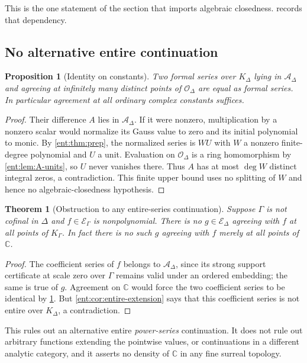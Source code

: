 \documentclass[11pt]{article}
\newtheorem{theorem}{Theorem}[section]
\theoremstyle{plain}
\theoremstyle{plain}
\newtheorem{proposition}[proposition]{Proposition}
\theoremstyle{plain}
\theoremstyle{definition}
\theoremstyle{definition}
\theoremstyle{definition}
\theoremstyle{definition}
\theoremstyle{remark}
\newcommand{\C}{\mathbb C}\newcommand{\R}{\mathbb R}
\newcommand{\K}{K_\Gamma}\newcommand{\KD}{K_\Delta}
\newcommand{\E}{\mathcal E_\Gamma}
\begin{document}
This is the one statement of the section that imports algebraic closedness.
 records that dependency.

\subsection{No alternative entire continuation}
\begin{proposition}[Identity on constants]\label{ent:prop:identity}
Two formal series over $\KD$ lying in $\mathcal A_\Delta$ and agreeing at
infinitely many distinct points of $\mathcal O_\Delta$ are equal as formal
series. In particular agreement at all ordinary complex constants suffices.
\end{proposition}
\begin{proof}
Their difference $A$ lies in $\mathcal A_\Delta$. If it were nonzero,
multiplication by a nonzero scalar would normalize its Gauss value to zero
and its initial polynomial to monic. By \cref{ent:thm:prep}, the normalized
series is $WU$ with $W$ a nonzero finite-degree polynomial and $U$ a unit.
Evaluation on $\mathcal O_\Delta$ is a ring homomorphism by
\cref{ent:lem:A-units}, so $U$ never vanishes there. Thus $A$ has at most
$\deg W$ distinct integral zeros, a contradiction. This finite upper bound
uses no splitting of $W$ and hence no algebraic-closedness hypothesis.
\end{proof}

\begin{theorem}[Obstruction to any entire-series continuation]
\label{ent:thm:no-continuation}
Suppose $\Gamma$ is not cofinal in $\Delta$ and $f\in\E$ is nonpolynomial.
There is no $g\in\mathcal E_\Delta$ agreeing with $f$ at all points of $\K$.
In fact there is no such $g$ agreeing with $f$ merely at all points of $\C$.
\end{theorem}
\begin{proof}
The coefficient series of $f$ belongs to $\mathcal A_\Delta$, since its
strong support certificate at scale zero over $\Gamma$ remains valid under an
ordered embedding; the same is true of $g$. Agreement on $\C$ would force the
two coefficient series to be identical by \cref{ent:prop:identity}. But
\cref{ent:cor:entire-extension} says that this coefficient series is not
entire over $\KD$, a contradiction.
\end{proof}

This rules out an alternative entire \emph{power-series} continuation. It
does not rule out arbitrary functions extending the pointwise values, or
continuations in a different analytic category, and it asserts no density of
$\C$ in any fine surreal topology.
\end{document}
